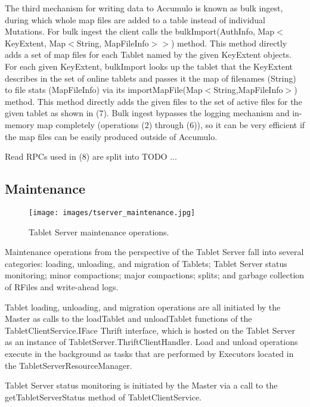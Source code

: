 \documentclass[letterpaper,onecolumn,12pt,titlepage]{article}
\begin{document}
The third mechanism for writing data to Accumulo is known as bulk ingest, during which whole map files are added to a table instead of individual Mutations.
For bulk ingest the client calls the bulkImport(AuthInfo, Map$<$KeyExtent, Map$<$String, MapFileInfo$>$$>$) method.
This method directly adds a set of map files for each Tablet named by the given KeyExtent objects.
For each given KeyExtent, bulkImport looks up the tablet that the KeyExtent describes in the set of online tablets and passes it the map of filenames (String) to file stats (MapFileInfo) via its importMapFile(Map$<$String,MapFileInfo$>$) method.
This method directly adds the given files to the set of active files for the given tablet as shown in (7).
Bulk ingest bypasses the logging mechanism and in-memory map completely (operations (2) through (6)), so it can be very efficient if the map files can be easily produced outside of Accumulo.

Read RPCs used in (8) are split into TODO ...

\subsection{Maintenance}
\begin{figure}[htbp]
\center
\texttt{[image: images/tserver\_maintenance.jpg]}
\caption{\label{fig_ts_maintenance} Tablet Server maintenance operations.}
\end{figure}

Maintenance operations from the perspective of the Tablet Server fall into several categories: loading, unloading, and migration of Tablets; Tablet Server status monitoring; minor compactions; major compactions; splits; and garbage collection of RFiles and write-ahead logs.

Tablet loading, unloading, and migration operations are all initiated by the Master as calls to the loadTablet and unloadTablet functions of the TabletClientService.IFace Thrift interface, which is hosted on the Tablet Server as an instance of TabletServer.ThriftClientHandler.
Load and unload operations execute in the background as tasks that are performed by Executors located in the TabletServerResourceManager.

Tablet Server status monitoring is initiated by the Master via a call to the getTabletServerStatus method of TabletClientService.

\end{document}

